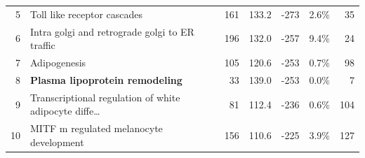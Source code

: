 \begin{table}[!htbp]
\begin{tabular*}{\linewidth}{@{\extracolsep{\fill}}rlrrrrr}
5 & Toll like receptor cascades & 161 & 133.2 & -273 & 2.6\% & 35 \\
6 & Intra golgi and retrograde golgi to ER traffic & 196 & 132.0 & -257 & 9.4\% & 24 \\
7 & Adipogenesis & 105 & 120.6 & -253 & 0.7\% & 98 \\
8 & \textbf{Plasma lipoprotein remodeling} & 33 & 139.0 & -253 & 0.0\% & 7 \\
9 & Transcriptional regulation of white adipocyte diffe\ldots & 81 & 112.4 & -236 & 0.6\% & 104 \\
10 & MITF m regulated melanocyte development & 156 & 110.6 & -225 & 3.9\% & 127 \\
\hline
\end{tabular*}
\end{table}
